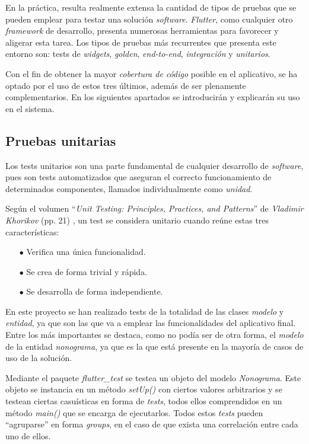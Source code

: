  En la práctica, resulta realmente extensa la cantidad de tipos de pruebas que se pueden emplear para testar una
 solución \textit{software}. \textit{Flutter}, como cualquier otro \textit{framework} de desarrollo, presenta
 numerosas herramientas para favorecer y aligerar esta tarea. Los tipos de pruebas más recurrentes que presenta este entorno
 son: tests de \textit{widgets}, \textit{golden}, \textit{end-to-end}, 
 \textit{integración} y \textit{unitarios}.
 
 Con el fin de obtener la mayor \textit{cobertura de código} posible en el aplicativo, se ha optado por el uso de estos
 tres últimos, además de ser plenamente complementarios. En los siguientes apartados se introducirán y explicarán su uso en el sistema.

 \subsection{Pruebas unitarias}
 Los tests unitarios son una parte fundamental de cualquier desarrollo
 de \textit{software}, pues son tests automatizados que aseguran el correcto
 funcionamiento de determinados componentes, llamados individualmente como \textit{unidad}.

 Según el volumen ``\textit{Unit Testing: Principles, Practices, and Patterns}'' de \textit{Vladimir Khorikov} (pp. 21) \cite{khorikov2020unit}, un test se considera unitario cuando reúne estas tres características:
 \begin{itemize}
     \item[$\bullet$] Verifica una única funcionalidad.
     \item[$\bullet$] Se crea de forma trivial y rápida.
     \item[$\bullet$] Se desarrolla de forma independiente.
 \end{itemize}

 En este proyecto se han realizado tests de la totalidad de las clases \textit{modelo} y \textit{entidad}, ya que
 son las que va a emplear las funcionalidades del aplicativo final. Entre los más importantes se destaca, como
 no podía ser de otra forma, el \textit{modelo} de la entidad
 \textit{nonograma}, ya que es la que está presente en la mayoría de casos de uso de la solución.

 Mediante el paquete \textit{flutter\_test} se testea un objeto del
 modelo \textit{Nonograma}. Este objeto se instancia en un método \textit{setUp()} con ciertos valores 
 arbitrarios y se testean ciertas casuísticas en forma de \textit{tests}, 
 todos ellos comprendidos en un método \textit{main()}
 que se encarga de ejecutarlos.
 Todos estos \textit{tests} pueden ``agruparse'' en forma \textit{groups}, en el caso de que exista una correlación
 entre cada uno de ellos.

